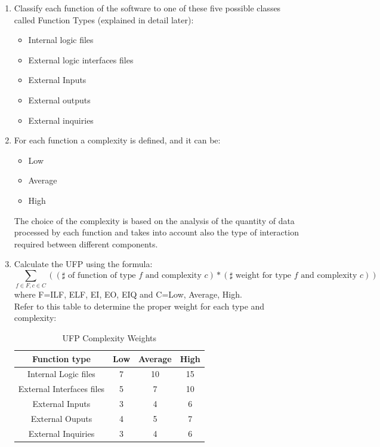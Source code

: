 \begin{enumerate}
\item Classify each function of the software to one of these five possible classes called Function Types (explained in detail later):
\begin{itemize}
\item Internal logic files
\item External logic interfaces files
\item External Inputs
\item External outputs
\item External inquiries
\end{itemize}
\item For each function a complexity is defined, and it can be:
\begin{itemize}
\item Low
\item Average
\item High
\end{itemize}
The choice of the complexity is based on the analysis of the quantity of data processed by each function and takes into account also the type of interaction required between different components.
\item Calculate the UFP using the formula:
\[ \sum_{f\in F, c\in C} ((\sharp \text{ of function of type } f \text{ and complexity }c)*(\sharp \text{ weight for type } f \text{ and complexity }c)) \]
where F={ILF, ELF, EI, EO, EIQ} and C={Low, Average, High}. \\
Refer to this table to determine the proper weight for each type and complexity:
\begin{table}[!h]
\centering
\caption{UFP Complexity Weights}
\label{ufp-complex}
\begin{tabular}{cccc}
\hline
Function type             & Low & Average & High \\ \hline
Internal Logic files      & 7   & 10      & 15 \\
External Interfaces files & 5   & 7       & 10 \\
External Inputs           & 3   & 4       & 6  \\
External Ouputs           & 4   & 5       & 7  \\
External Inquiries        & 3   & 4       & 6  \\ \hline
\end{tabular}
\end{table}
\end{enumerate}

